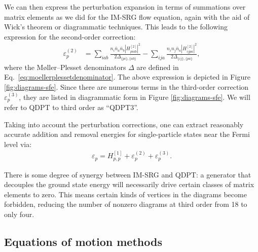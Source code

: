 We can then express the perturbation expansion in terms of summations
over matrix elements as we did for the IM-SRG flow
equation, again with the aid of Wick's theorem or diagrammatic
techniques.  This leads to the following expression for the
second-order correction:
\begin{align*}
  \varepsilon_p^{(2)}
  &=
    \sum_{iab} \frac{n_i \bar{n}_a \bar{n}_b |H^{[2]}_{piab}|^2}{2 \Delta_{\{pi\}, \{ab\}}}
    - \sum_{ija} \frac{n_i n_j \bar{n}_a |H^{[2]}_{ijpa}|^2}{2 \Delta_{\{ij\}, \{pa\}}},
\end{align*}
where the M\o ller--Plesset denominators $\Delta$ are defined in
Eq.~\eqref{eq:moellerplessetdenominator}.  The above expression is
depicted in Figure \ref{fig:diagrams-sfe}.  Since there are numerous
terms in the third-order correction $\varepsilon_p^{(3)}$, they are
listed in diagrammatic form in Figure \ref{fig:diagrams-sfe}.  We will
refer to QDPT to third order as ``QDPT3''.

Taking into account the perturbation corrections, one can extract
reasonably accurate addition and removal energies for single-particle
states near the Fermi level via:
\begin{align*}
  \varepsilon_p = H^{[1]}_{p, p} + \varepsilon_p^{(2)} + \varepsilon_p^{(3)}.
\end{align*}

There is some degree of synergy between IM-SRG and QDPT: a generator
that decouples the ground state energy will necessarily drive certain
classes of matrix elements to zero.  This means certain kinds of
vertices in the diagrams become forbidden, reducing the number of
nonzero diagrams at third order from 18 to only four.

\subsection{Equations of motion methods}

